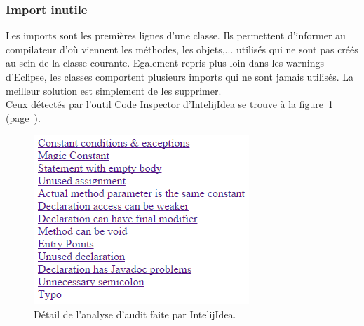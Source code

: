 \documentclass[12pt,a4paper,final]{article}
\newcommand{\labelfigure}[1]{figure~\ref{#1} (page~\pageref{#1})}
\begin{document}
\subsubsection{Import inutile}
Les imports sont les premières lignes d'une classe. Ils permettent d'informer au compilateur d'où viennent les méthodes, les objets,... utilisés qui ne sont pas créés au sein de la classe courante.
Egalement repris plus loin dans les warnings d'Eclipse, les classes comportent plusieurs imports qui ne sont jamais utilisés.
La meilleur solution est simplement de les supprimer.\\
Ceux détectés par l'outil Code Inspector d'IntelijIdea  se trouve à la \labelfigure{Audit}. 
\begin{figure}[!h]
	\centering
	\includegraphics[width=\textwidth]{AuditII.png}
	\caption{\label{Audit}Détail de l'analyse d'audit faite par IntelijIdea.}
\end{figure}
\end{document}
